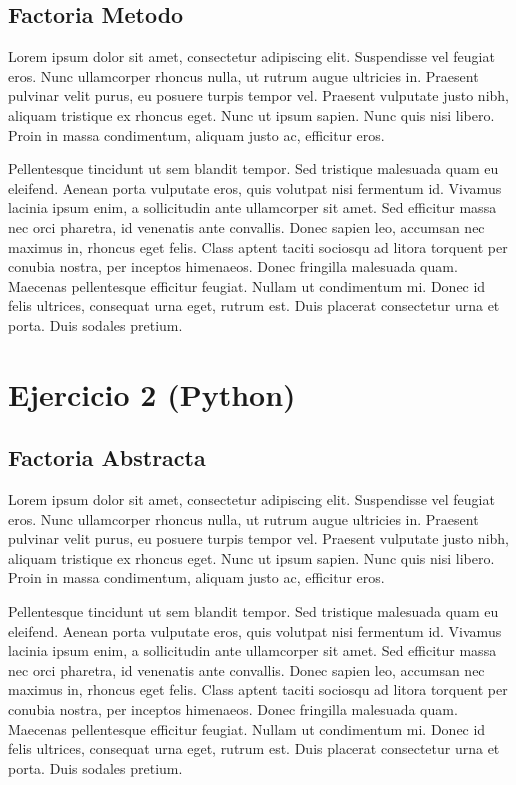 \documentclass{article}
\begin{document}
	\subsection{Factoria Metodo}
	
	
	Lorem ipsum dolor sit amet, consectetur adipiscing elit. Suspendisse vel feugiat eros. Nunc ullamcorper rhoncus nulla, ut rutrum augue ultricies in. Praesent pulvinar velit purus, eu posuere turpis tempor vel. Praesent vulputate justo nibh, aliquam tristique ex rhoncus eget. Nunc ut ipsum sapien. Nunc quis nisi libero. Proin in massa condimentum, aliquam justo ac, efficitur eros.
	
	Pellentesque tincidunt ut sem blandit tempor. Sed tristique malesuada quam eu eleifend. Aenean porta vulputate eros, quis volutpat nisi fermentum id. Vivamus lacinia ipsum enim, a sollicitudin ante ullamcorper sit amet. Sed efficitur massa nec orci pharetra, id venenatis ante convallis. Donec sapien leo, accumsan nec maximus in, rhoncus eget felis. Class aptent taciti sociosqu ad litora torquent per conubia nostra, per inceptos himenaeos. Donec fringilla malesuada quam. Maecenas pellentesque efficitur feugiat. Nullam ut condimentum mi. Donec id felis ultrices, consequat urna eget, rutrum est. Duis placerat consectetur urna et porta. Duis sodales pretium. 
	\section{Ejercicio 2 (Python)}
	\subsection{Factoria Abstracta}
	
	
	Lorem ipsum dolor sit amet, consectetur adipiscing elit. Suspendisse vel feugiat eros. Nunc ullamcorper rhoncus nulla, ut rutrum augue ultricies in. Praesent pulvinar velit purus, eu posuere turpis tempor vel. Praesent vulputate justo nibh, aliquam tristique ex rhoncus eget. Nunc ut ipsum sapien. Nunc quis nisi libero. Proin in massa condimentum, aliquam justo ac, efficitur eros.
	
	Pellentesque tincidunt ut sem blandit tempor. Sed tristique malesuada quam eu eleifend. Aenean porta vulputate eros, quis volutpat nisi fermentum id. Vivamus lacinia ipsum enim, a sollicitudin ante ullamcorper sit amet. Sed efficitur massa nec orci pharetra, id venenatis ante convallis. Donec sapien leo, accumsan nec maximus in, rhoncus eget felis. Class aptent taciti sociosqu ad litora torquent per conubia nostra, per inceptos himenaeos. Donec fringilla malesuada quam. Maecenas pellentesque efficitur feugiat. Nullam ut condimentum mi. Donec id felis ultrices, consequat urna eget, rutrum est. Duis placerat consectetur urna et porta. Duis sodales pretium. 
\end{document}

